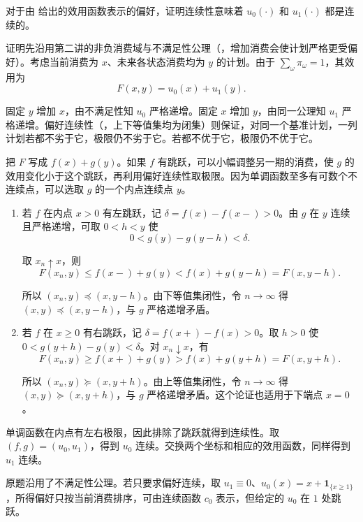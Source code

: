 \begin{problem}
\WJSixProblem{} 对于由 给出的效用函数表示的偏好，证明连续性意味着 $u_{0}(\cdot)$ 和 $u_{1}(\cdot)$ 都是连续的。
\end{problem}
\begin{solution}[label-content={证明},blank-type=manual,blank-vsep=9\baselineskip]
证明先沿用第二讲的非负消费域与不满足性公理\ifdefined\WJHandoutKnowledge（，增加消费会使计划严格更受偏好）\fi。考虑当前消费为 $x$、未来各状态消费均为 $y$ 的计划。由于 $\sum_\omega\pi_\omega=1$，其效用为
\[
 F(x,y)=u_0(x)+u_1(y).
\]

固定 $y$ 增加 $x$，由不满足性知 $u_0$ 严格递增。固定 $x$ 增加 $y$，由同一公理知 $u_1$ 严格递增。偏好连续性\ifdefined\WJHandoutKnowledge（，上下等值集均为闭集）\fi{}则保证，对同一个基准计划，一列计划若都不劣于它，极限仍不劣于它。若都不优于它，极限仍不优于它。

把 $F$ 写成 $f(x)+g(y)$。如果 $f$ 有跳跃，可以小幅调整另一期的消费，使 $g$ 的效用变化小于这个跳跃，再利用偏好连续性取极限。因为单调函数至多有可数个不连续点，可以选取 $g$ 的一个内点连续点 $y$。
\begin{enumerate}[label=(\roman*)]
\item 若 $f$ 在内点 $x>0$ 有左跳跃，记 $\delta=f(x)-f(x-)>0$。由 $g$ 在 $y$ 连续且严格递增，可取 $0<h<y$ 使
\[
 0<g(y)-g(y-h)<\delta.
\]

取 $x_n\uparrow x$，则
\[
 F(x_n,y)\le f(x-)+g(y)<f(x)+g(y-h)=F(x,y-h).
\]

所以 $(x_n,y)\preceq(x,y-h)$。由下等值集闭性，令 $n\to\infty$ 得 $(x,y)\preceq(x,y-h)$，与 $g$ 严格递增矛盾。
\item 若 $f$ 在 $x\ge0$ 有右跳跃，记 $\delta=f(x+)-f(x)>0$。取 $h>0$ 使 $0<g(y+h)-g(y)<\delta$。对 $x_n\downarrow x$，有
\[
 F(x_n,y)\ge f(x+)+g(y)>f(x)+g(y+h)=F(x,y+h).
\]

所以 $(x_n,y)\succeq(x,y+h)$。由上等值集闭性，令 $n\to\infty$ 得 $(x,y)\succeq(x,y+h)$，与 $g$ 严格递增矛盾。这个论证也适用于下端点 $x=0$。
\end{enumerate}
单调函数在内点有左右极限，因此排除了跳跃就得到连续性。取 $(f,g)=(u_0,u_1)$，得到 $u_0$ 连续。交换两个坐标和相应的效用函数，同样得到 $u_1$ 连续。

原题沿用了不满足性公理。若只要求偏好连续，取 $u_1\equiv0$、$u_0(x)=x+\mathbf 1_{\{x\ge1\}}$，所得偏好只按当前消费排序，可由连续函数 $c_0$ 表示，但给定的 $u_0$ 在 $1$ 处跳跃。

\end{solution}

